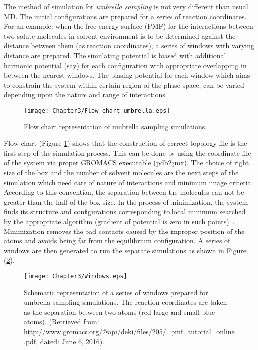 The method of simulation for {\it umbrella sampling} is not very different than usual MD. The initial configurations are prepared for a series of reaction coordinates. For an example: when the free energy surface (PMF) for the interactions between two solute molecules in solvent environment is to be determined against the distance between them (as reaction coordinates), a series of windows with varying distance are prepared. The simulating potential is biased with additional harmonic potential (say) for each configuration with appropriate overlapping in between the nearest windows. The biasing potential for each window which aims to constrain the system within certain region of the phase space, can be varied depending upon the nature and range of interactions.

\begin{figure}[h!]
\centering
\texttt{[image: Chapter3/Flow\_chart\_umbrella.eps]}
\caption{Flow chart representation of umbrella sampling simulations.}
\label{umbrella_flow}
\end{figure}

Flow chart (Figure \ref{umbrella_flow}) shows that the construction of correct topology file is the first step of the simulation process. This can be done by using the coordinate file of the system via proper GROMACS executable (pdb2gmx). The choice of right size of the box and the number of solvent molecules are the next steps of the simulation which need care of nature of interactions and minimum image criteria. According to this convention, the separation between the molecules can not be greater than the half of the box size. In the process of minimization, the system finds its structure and configurations corresponding to local minimum searched by the appropriate algorithm (gradient of potential is zero in such points)~\citep{Gromacs-manual}. Minimization removes the bad contacts caused by the improper position of the atoms and avoids being far from the equilibrium configuration. A series of windows are then generated to run the separate simulations as shown in Figure (\ref{windows}). 

\begin{figure}[h!]
\centering
\texttt{[image: Chapter3/Windows.eps]}
\caption[Schematic representation of a series of windows prepared for umbrella sampling simulations.]{Schematic representation of a series of windows prepared for umbrella sampling simulations. The reaction coordinates are taken as the separation between two atoms (red large and small blue atoms). (Retrieved from: \url{http://www.gromacs.org/@api/deki/files/205/=pmf_tutorial_online.pdf}, dated: June 6, 2016).}
\label{windows}
\end{figure}

